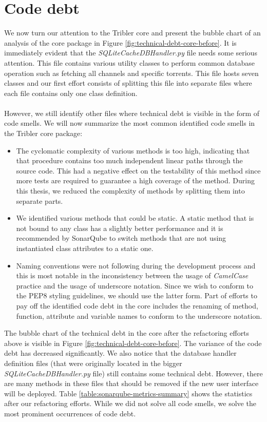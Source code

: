 \section{Code debt}
We now turn our attention to the Tribler core and present the bubble chart of an analysis of the core package in Figure \ref{fig:technical-debt-core-before}. It is immediately evident that the \emph{SQLiteCacheDBHandler.py} file needs some serious attention. This file contains various utility classes to perform common database operation such as fetching all channels and specific torrents. This file hosts seven classes and our first effort consists of splitting this file into separate files where each file contains only one class definition.\\\\
However, we still identify other files where technical debt is visible in the form of code smells. We will now summarize the most common identified code smells in the Tribler core package:
\begin{itemize}
	\item The cyclomatic complexity of various methods is too high, indicating that that procedure contains too much independent linear paths through the source code. This had a negative effect on the testability of this method since more tests are required to guarantee a high coverage of the method. During this thesis, we reduced the complexity of methods by splitting them into separate parts.
	\item We identified various methods that could be static. A static method that is not bound to any class has a slightly better performance and it is recommended by SonarQube to switch methods that are not using instantiated class attributes to a static one.
	\item Naming conventions were not following during the development process and this is most notable in the inconsistency between the usage of \emph{CamelCase} practice and the usage of underscore notation. Since we wish to conform to the PEP8 styling guidelines, we should use the latter form. Part of efforts to pay off the identified code debt in the core includes the renaming of method, function, attribute and variable names to conform to the underscore notation.
\end{itemize}
The bubble chart of the technical debt in the core after the refactoring efforts above is visible in Figure \ref{fig:technical-debt-core-before}. The variance of the code debt has decreased significantly. We also notice that the database handler definition files (that were originally located in the bigger \emph{SQLiteCacheDBHandler.py} file) still contains some technical debt. However, there are many methods in these files that should be removed if the new user interface will be deployed. Table \ref{table:sonarqube-metrics-summary} shows the statistics after our refactoring efforts. While we did not solve all code smells, we solve the most prominent occurrences of code debt.

